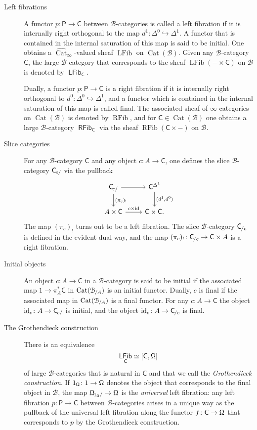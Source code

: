 \documentclass[reqno]{amsart}
\numberwithin{equation}{subsection}
\theoremstyle{plain}
\theoremstyle{definition}
\let\scr=\mathcal
\let\into=\hookrightarrow
\def\BB{\scr B}
\DeclareMathOperator{\id}{id}
\DeclareMathOperator{\Cat}{Cat}
\DeclareMathOperator{\RFib}{RFib}
\DeclareMathOperator{\LFib}{LFib}
\DeclareMathOperator{\ILFib}{\mathsf{LFib}}
\DeclareMathOperator{\IRFib}{\mathsf{RFib}}
\newcommand{\Over}[2]{#1_{\hspace{-1pt}/#2}}
\newcommand{\Under}[2]{#1_{\hspace{-1pt}#2/}}
\newcommand{\I}[1]{\mathsf{#1}}
\newcommand{\iFun}[2]{{[#1,#2]}}
\newcommand{\CatSS}{\widehat{\Cat}_\infty}
\begin{document}
\begin{description}
    \item[Left fibrations] A functor $p\colon \I{P}\to\I{C}$ between $\BB$-categories is called a left fibration if it is internally right orthogonal to the map $d^1\colon \Delta^0\into\Delta^1$. A functor that is contained in the internal saturation of this map is said to be initial. One obtains a $\CatSS$-valued sheaf $\LFib$ on $\Cat(\BB)$. Given any $\BB$-category $\I{C}$, the large $\BB$-category that corresponds to the sheaf $\LFib(-\times \I{C})$ on $\BB$ is denoted by $\ILFib_{\I{C}}$.
    
    Dually, a functor $p\colon \I{P}\to\I{C}$ is a right fibration if it is internally right orthogonal to $d^0\colon \Delta^0\into\Delta^1$, and a functor which is contained in the internal saturation of this map is called final. The associated sheaf of $\infty$-categories on $\Cat(\BB)$ is denoted by $\RFib$, and for $\I{C}\in\Cat(\BB)$ one obtains a large $\BB$-category $\IRFib_{\I{C}}$ via the sheaf $\RFib(\I{C}\times -)$ on $\BB$.
    
    \item[Slice categories] For any $\BB$-category $\I{C}$ and any object $c\colon A\to \I{C}$, one defines the slice $\BB$-category $\Under{\I{C}}{c}$ via the pullback
    \begin{equation*}
        \begin{tikzcd}
            \Under{\I{C}}{c}\arrow[d, "(\pi_c)_!"]\arrow[r] & \I{C}^{\Delta^1}\arrow[d, "{(d^1,d^0)}"]\\
            A\times\I{C}\arrow[r, "{c\times\id}"] & \I{C}\times\I{C}.
        \end{tikzcd}
    \end{equation*}
    The map $(\pi_c)_!$ turns out to be a left fibration. The slice $\BB$-category $\Over{\I{C}}{c}$ is defined in the evident dual way, and the map $(\pi_c)_!\colon \Over{\I{C}}{c}\to \I{C}\times A$ is a right fibration.
    
    \item[Initial objects] An object $c\colon A\to \I{C}$ in a $\BB$-category is said to be initial if the associated map $1\to \pi_A^\ast\I{C}$ in $\Cat(\Over{\BB}{A})$ is an initial functor. Dually, $c$ is final if the associated map in $\Cat(\Over{\BB}{A})$ is a final functor. For any $c\colon A\to \I{C}$ the object $\id_{c}\colon A\to \Under{\I{C}}{c}$ is initial, and the object $\id_c\colon A\to \Over{\I{C}}{c}$ is final.
    \item[The Grothendieck construction]
    There is an equivalence
    \begin{equation*}
        \ILFib_{\I{C}}\simeq \iFun{\I{C}}{\Univ}
    \end{equation*}
    of large $\BB$-categories that is natural in $\I{C}$ and that we call the \emph{Grothendieck construction}. 
    If $1_{\Univ}\colon 1\to \Univ$ denotes the object that corresponds to the final object in $\BB$, the map $\Under{\Univ}{1_{\Univ}}\to\Univ$ is the \emph{universal} left fibration: any left fibration $p\colon \I{P}\to \I{C}$ between $\BB$-categories arises in a unique way as the pullback of the universal left fibration along the functor $f\colon \I{C}\to\Univ$ that corresponds to $p$ by the Grothendieck construction.
    

\end{description}
\end{document}
